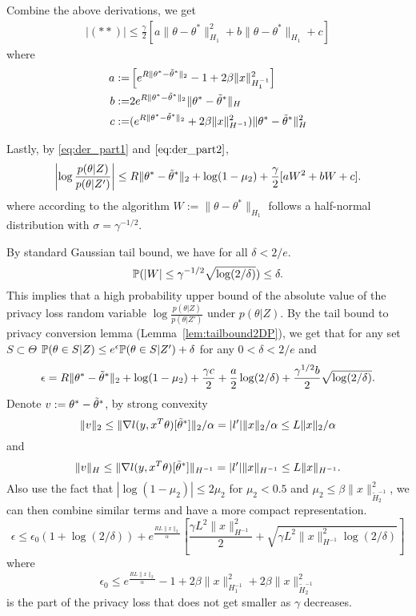 Combine the above derivations, we get 
\begin{align}
\left|(**)\right|  \leq \frac{\gamma}{2}\left[  a \|\theta-\theta^*\|_{H_1}^2 + b \|\theta-\theta^*\|_{H_1}  +c\right] \label{eq:der_part2}
\end{align}
where 
\begin{align*}
a :=& \left[ e^{R\|\theta^*-\ttheta^*\|_2} -1  + 2\beta \|x\|_{H_1^{-1}}^2\right] \\
b:=& 2 e^{R\|\theta^*-\ttheta^*\|_2}   \|\theta^*-\ttheta^*\|_H \\
c:=& (e^{R\|\theta^*-\ttheta^*\|_2} + 2\beta \|x\|_{H^{-1}}^2)\|\theta^*-\ttheta^*\|_H^2
\end{align*}

Lastly, by \eqref{eq:der_part1} and $\eqref{eq:der_part2}$, 
$$
\left|  \log\frac{p(\theta|Z)}{p(\theta|Z')}  \right|  \leq R\|\theta^*-\ttheta^*\|_2  + \log(1-\mu_2)  +  \frac{\gamma}{2} [ a W^2 + bW + c].
$$
where according to the algorithm $W:= \|\theta-\theta^*\|_{H_1}$ follows a half-normal distribution with $\sigma=\gamma^{-1/2}$.

By standard Gaussian tail bound, we have for all $\delta<2/e$.
$$
\P(|W|\leq \gamma^{-1/2} \sqrt{\log(2/\delta)} )  \leq \delta.
$$
This implies that a high probability upper bound of the absolute value of the privacy loss random variable $\log \frac{p(\theta|Z)}{p(\theta|Z')}$ under $p(\theta|Z)$.
By the tail bound to privacy conversion lemma (Lemma~\ref{lem:tailbound2DP}), we get 
that for any set $S\subset \Theta$
$\P(\theta \in S | Z) \leq e^\epsilon \P(\theta \in S | Z') +\delta$
for any $0<\delta<2/e$ and 
$$
\epsilon  = R\|\theta^*-\ttheta^*\|_2  + \log(1-\mu_2)  + \frac{\gamma c}{2}  + \frac{a}{2}  \log(2/\delta)  +  \frac{\gamma^{1/2} b}{2}  \sqrt{\log(2/\delta)}.
$$
Denote $v:=  \theta^*-\ttheta^*$, by strong convexity
$$\|v\|_2\leq \|\nabla l(y,x^T\theta)[\ttheta^*]\|_2/\alpha  = |l'| \|x\|_2 / \alpha \leq L\|x\|_2/\alpha$$
and 
$$
\|v\|_H \leq \|\nabla l(y,x^T\theta)[\ttheta^*]\|_{H^{-1}}  =  |l'| \|x\|_{H^{-1}} \leq L\|x\|_{H^{-1}}.
$$
Also use the fact that $|\log(1-\mu_2)| \leq 2\mu_2$ for $\mu_2<0.5$ and $\mu_2\leq \beta\|x\|_{\tilde{H}_2^{-1}}^2 $, we can then combine similar terms and have a more compact representation.
$$
\epsilon \leq \epsilon_0(1+\log(2/\delta))  +  e^{\frac{RL\|x\|_2}{\alpha}} \left[\frac{\gamma L^2\|x\|_{H^{-1}}^2}{2} +  \sqrt{ \gamma L^2\|x\|_{H^{-1}}^2\log(2/\delta) }\right]
$$
where 
$$\epsilon_0 \leq e^{\frac{RL\|x\|_2}{\alpha}} -1  + 2\beta \|x\|_{H_1^{-1}}^2 +  2\beta\|x\|_{\tilde{H}_2^{-1}}^2$$ 
is the part of the privacy loss that does not get smaller as $\gamma$ decreases.






